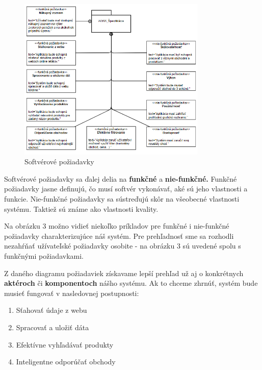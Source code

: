 \documentclass[twoside,slovak, a4paper]{article}
\begin{document}
\begin{figure}[tbh]
  \centering
  \includegraphics[width=0.8\textwidth]{pics/design/requirements_2.png}
  \caption{Softvérové požiadavky}
  \label{fig:6}
\end{figure}

Softvérové požiadavky sa ďalej delia na \textbf{funkčné} a \textbf{nie-funkčné.} Funkčné požiadavky jasne definujú, čo musí softvér vykonávať, aké sú jeho vlastnosti a funkcie. Nie-funkčné požiadavky sa sústreďujú skôr na všeobecné vlastnosti systému. Taktiež sú známe ako vlastnosti kvality.\cite{AS:FNR}

Na obrázku 3 možno vidieť niekoľko príkladov pre funkčné i nie-funkčné požiadavky charakterizujúce náš systém. Pre prehľadnosť sme sa rozhodli nezahŕňať užívateľské požiadavky osobite - na obrázku 3 sú uvedené spolu s funkčnými požiadavkami.

Z daného diagramu požiadaviek získavame lepší prehľad už aj o konkrétnych \textbf{aktéroch} či \textbf{komponentoch} nášho systému. Ak to chceme zhrnúť, systém bude musieť fungovať v nasledovnej postupnosti:

\begin{enumerate}
    \setlength{\itemsep}{4pt}
    \setlength{\parskip}{1pt}
    
    \item Sťahovať údaje z webu
    \item Spracovať a uložiť dáta
    \item Efektívne vyhľadávať produkty
    \item Inteligentne odporúčať obchody
\end{enumerate}
\end{document}
